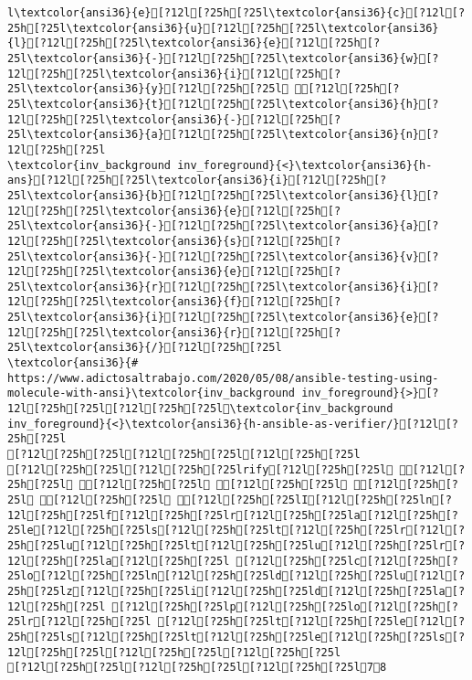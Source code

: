 \documentclass{scrartcl}
\begin{document}
\begin{Verbatim}
l\textcolor{ansi36}{e}[?12l[?25h[?25l\textcolor{ansi36}{c}[?12l[?25h[?25l\textcolor{ansi36}{u}[?12l[?25h[?25l\textcolor{ansi36}{l}[?12l[?25h[?25l\textcolor{ansi36}{e}[?12l[?25h[?25l\textcolor{ansi36}{-}[?12l[?25h[?25l\textcolor{ansi36}{w}[?12l[?25h[?25l\textcolor{ansi36}{i}[?12l[?25h[?25l\textcolor{ansi36}{y}[?12l[?25h[?25l [?12l[?25h[?25l\textcolor{ansi36}{t}[?12l[?25h[?25l\textcolor{ansi36}{h}[?12l[?25h[?25l\textcolor{ansi36}{-}[?12l[?25h[?25l\textcolor{ansi36}{a}[?12l[?25h[?25l\textcolor{ansi36}{n}[?12l[?25h[?25l
\textcolor{inv_background inv_foreground}{<}\textcolor{ansi36}{h-ans}[?12l[?25h[?25l\textcolor{ansi36}{i}[?12l[?25h[?25l\textcolor{ansi36}{b}[?12l[?25h[?25l\textcolor{ansi36}{l}[?12l[?25h[?25l\textcolor{ansi36}{e}[?12l[?25h[?25l\textcolor{ansi36}{-}[?12l[?25h[?25l\textcolor{ansi36}{a}[?12l[?25h[?25l\textcolor{ansi36}{s}[?12l[?25h[?25l\textcolor{ansi36}{-}[?12l[?25h[?25l\textcolor{ansi36}{v}[?12l[?25h[?25l\textcolor{ansi36}{e}[?12l[?25h[?25l\textcolor{ansi36}{r}[?12l[?25h[?25l\textcolor{ansi36}{i}[?12l[?25h[?25l\textcolor{ansi36}{f}[?12l[?25h[?25l\textcolor{ansi36}{i}[?12l[?25h[?25l\textcolor{ansi36}{e}[?12l[?25h[?25l\textcolor{ansi36}{r}[?12l[?25h[?25l\textcolor{ansi36}{/}[?12l[?25h[?25l
\textcolor{ansi36}{# https://www.adictosaltrabajo.com/2020/05/08/ansible-testing-using-molecule-with-ansi}\textcolor{inv_background inv_foreground}{>}[?12l[?25h[?25l[?12l[?25h[?25l\textcolor{inv_background inv_foreground}{<}\textcolor{ansi36}{h-ansible-as-verifier/}[?12l[?25h[?25l
[?12l[?25h[?25l[?12l[?25h[?25l[?12l[?25h[?25l
[?12l[?25h[?25l[?12l[?25h[?25lrify[?12l[?25h[?25l [?12l[?25h[?25l [?12l[?25h[?25l [?12l[?25h[?25l [?12l[?25h[?25l [?12l[?25h[?25l [?12l[?25h[?25lI[?12l[?25h[?25ln[?12l[?25h[?25lf[?12l[?25h[?25lr[?12l[?25h[?25la[?12l[?25h[?25le[?12l[?25h[?25ls[?12l[?25h[?25lt[?12l[?25h[?25lr[?12l[?25h[?25lu[?12l[?25h[?25lt[?12l[?25h[?25lu[?12l[?25h[?25lr[?12l[?25h[?25la[?12l[?25h[?25l [?12l[?25h[?25lc[?12l[?25h[?25lo[?12l[?25h[?25ln[?12l[?25h[?25ld[?12l[?25h[?25lu[?12l[?25h[?25lz[?12l[?25h[?25li[?12l[?25h[?25ld[?12l[?25h[?25la[?12l[?25h[?25l [?12l[?25h[?25lp[?12l[?25h[?25lo[?12l[?25h[?25lr[?12l[?25h[?25l [?12l[?25h[?25lt[?12l[?25h[?25le[?12l[?25h[?25ls[?12l[?25h[?25lt[?12l[?25h[?25le[?12l[?25h[?25ls[?12l[?25h[?25l[?12l[?25h[?25l[?12l[?25h[?25l
[?12l[?25h[?25l[?12l[?25h[?25l[?12l[?25h[?25l78

\end{Verbatim}
\end{document}
